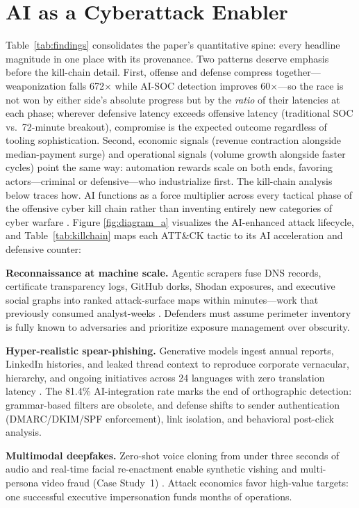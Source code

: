 \documentclass[conference,10pt,twocolumn,a4paper]{IEEEtran}
\begin{document}
\section{AI as a Cyberattack Enabler}
Table~\ref{tab:findings} consolidates the paper's quantitative spine: every headline magnitude in one place with its provenance. Two patterns deserve emphasis before the kill-chain detail. First, offense and defense compress together---weaponization falls 672$\times$ while AI-SOC detection improves 60$\times$---so the race is not won by either side's absolute progress but by the \emph{ratio} of their latencies at each phase; wherever defensive latency exceeds offensive latency (traditional SOC vs.\ 72-minute breakout), compromise is the expected outcome regardless of tooling sophistication. Second, economic signals (revenue contraction alongside median-payment surge) and operational signals (volume growth alongside faster cycles) point the same way: automation rewards scale on both ends, favoring actors---criminal or defensive---who industrialize first. The kill-chain analysis below traces how.
AI functions as a force multiplier across every tactical phase of the offensive cyber kill chain rather than inventing entirely new categories of cyber warfare \cite{enisa_etl_2025, enisa_frontier_2026, fang2024llm}. Figure \ref{fig:diagram_a} visualizes the AI-enhanced attack lifecycle, and Table~\ref{tab:killchain} maps each ATT\&CK tactic to its AI acceleration and defensive counter:

\textbf{Reconnaissance at machine scale.} Agentic scrapers fuse DNS records, certificate transparency logs, GitHub dorks, Shodan exposures, and executive social graphs into ranked attack-surface maps within minutes---work that previously consumed analyst-weeks \cite{fang2024teams}. Defenders must assume perimeter inventory is fully known to adversaries and prioritize exposure management over obscurity.

\textbf{Hyper-realistic spear-phishing.} Generative models ingest annual reports, LinkedIn histories, and leaked thread context to reproduce corporate vernacular, hierarchy, and ongoing initiatives across 24 languages with zero translation latency \cite{enisa_etl_2025, slashnext_genai_2025}. The 81.4\% AI-integration rate marks the end of orthographic detection: grammar-based filters are obsolete, and defense shifts to sender authentication (DMARC/DKIM/SPF enforcement), link isolation, and behavioral post-click analysis.

\textbf{Multimodal deepfakes.} Zero-shot voice cloning from under three seconds of audio and real-time facial re-enactment enable synthetic vishing and multi-persona video fraud (Case Study~1) \cite{hkpf_deepfake_case_2024, fbi_deepfakes_bec_2025}. Attack economics favor high-value targets: one successful executive impersonation funds months of operations.
\end{document}
